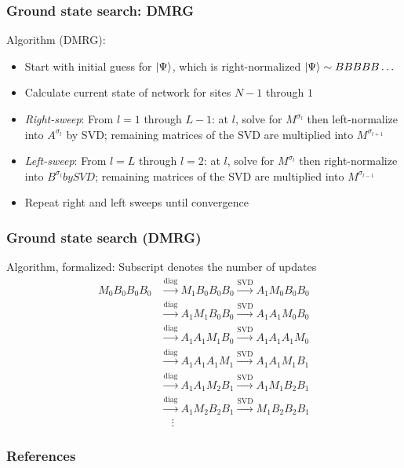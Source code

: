 \documentclass{beamer}
\theoremstyle{definition}
\begin{document}
\begin{frame}
	\frametitle{Ground state search: DMRG}
	Algorithm (DMRG): \vspace{5pt}
	\begin{itemize}
		\item Start with initial guess for $\ket{\Psi}$, which is right-normalized $\ket{\Psi} \sim BBBBB\dots$
		\vspace{5pt}
		\item Calculate current state of network for sites $N-1$ through $1$
		\vspace{5pt}
		\item \textit{Right-sweep}: From $l=1$ through $L-1$: at $l$, solve for $M^{\sigma_l}$ then left-normalize into $A^{\sigma_l}$ by SVD; remaining matrices of the SVD are multiplied into $M^{\sigma_{l+1}}$ 
		\vspace{5pt}
		
		\item \textit{Left-sweep}: From $l=L$ through $l=2$: at $l$, solve for $M^{\sigma_l}$ then right-normalize into $B^{\sigma_l} by SVD$; remaining matrices of the SVD are multiplied into $M^{\sigma_{l-1}}$
		\vspace{5pt}
		
		\item Repeat right and left sweeps until convergence
	\end{itemize}
\end{frame}


\begin{frame}
	\frametitle{Ground state search (DMRG)}
	
	Algorithm, formalized: Subscript denotes the number of updates
	\begin{align*}
		M_0 B_0 B_0 B_0 &\xrightarrow{\text{diag}} M_1 B_0 B_0 B_0  \xrightarrow{\text{SVD}} A_1 M_0 B_0 B_0  \\
		&\xrightarrow{\text{diag}} A_1 M_1 B_0 B_0  \xrightarrow{\text{SVD}} A_1 A_1 M_0 B_0  \\
		&\xrightarrow{\text{diag}} A_1 A_1 M_1 B_0  \xrightarrow{\text{SVD}} A_1 A_1 A_1 M_0  \\
		&\xrightarrow{\text{diag}} A_1 A_1 A_1 M_1  \xrightarrow{\text{SVD}} A_1 A_1 M_1 B_1  \\
		&\xrightarrow{\text{diag}} A_1 A_1 M_2 B_1  \xrightarrow{\text{SVD}} A_1 M_1 B_2 B_1  \\
		&\xrightarrow{\text{diag}} A_1 M_2 B_2 B_1   \xrightarrow{\text{SVD}} M_1 B_2 B_2 B_1  \\
		&\quad\vdots
	\end{align*}
	
\end{frame}

\begin{frame}
	\frametitle{References}
	
	\nocite{*}
	
	
\end{frame}
\end{document}
